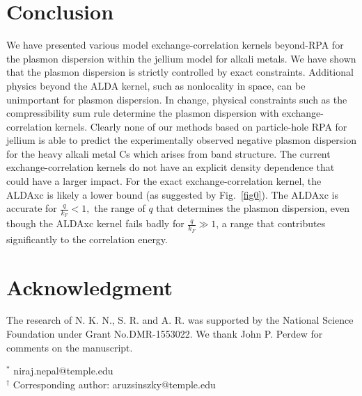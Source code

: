 \documentclass[aps,amsmath,amssymb, preprint, 12pt]{revtex4-1}
\begin{document}
\section{Conclusion}
We have presented various model exchange-correlation kernels beyond-RPA for the plasmon dispersion within the jellium model for alkali metals. We have shown that the plasmon dispersion is strictly controlled by exact constraints. Additional physics beyond the ALDA kernel, such as nonlocality in space, can be unimportant for plasmon dispersion. In change, physical constraints such as the compressibility sum rule determine the plasmon dispersion with exchange-correlation kernels. Clearly none of our methods based on particle-hole RPA for jellium is able to predict the experimentally observed negative plasmon dispersion for the heavy alkali metal Cs which arises from band structure. The current exchange-correlation kernels do not have an explicit density dependence that could have a larger impact. For the exact exchange-correlation kernel, the ALDAxc is likely a lower bound (as suggested by Fig.~\ref{fig0}). The ALDAxc is accurate for  \( \frac{q}{k_{F}}<1, \)  the range of  \( q \)  that determines the plasmon dispersion, even though the ALDAxc kernel fails badly for  \( \frac{q}{k_{F}} \gg 1 \), a range that contributes significantly to the correlation energy.



\section{Acknowledgment}
 
The research of N. K. N., S. R. and A. R. was supported by the National Science Foundation under Grant {\fontsize{10pt}{12.0pt}\selectfont No.DMR-1553022}. We thank John P. Perdew for comments on the manuscript.

\noindent$^*$ niraj.nepal@temple.edu\\
$^\dagger$ Corresponding author: aruzsinszky@temple.edu\\
\end{document}
